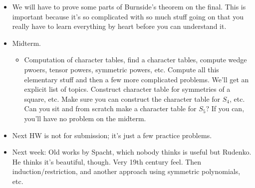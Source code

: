 \documentclass[../notes.tex]{subfiles}
\begin{document}
\begin{itemize}
\begin{proof}
        It follows that the sum in the above equation is divisible by $pq$. Thus,
        \begin{equation*}
            \frac{1}{pq} = \Bigg( \underbrace{p^{a-1}q^{b-1}\vphantom{\sum_{|C|>1}}}_{\in\Z}-\underbrace{\frac{1}{pq}\sum_{|C|>1}|C|}_{\in\Z} \Bigg)
        \end{equation*}
        That is to say, $1/pq$ (which is clearly not an integer) is equal to an integer, a contradiction.
    \end{proof}
    \item We will have to prove some parts of Burnside's theorem on the final. This is important because it's so complicated with so much stuff going on that you really have to learn everything by heart before you can understand it.
    \item Midterm.
    \begin{itemize}
        \item Computation of character tables, find a character tables, compute wedge pwoers, tensor powers, symmetric powers, etc. Compute all this elementary stuff and then a few more complicated problems. We'll get an explicit list of topics. Construct character table for symmetries of a square, etc. Make sure you can construct the character table for $S_4$, etc. Can you sit and from scratch make a character table for $S_5$? If you can, you'll have no problem on the midterm.
    \end{itemize}
    \item Next HW is not for submission; it's just a few practice problems.
    \item Next week: Old works by Spacht, which nobody thinks is useful but Rudenko. He thinks it's beautiful, though. Very 19th century feel. Then induction/restriction, and another approach using symmetric polynomials, etc.
\end{itemize}
\end{document}
